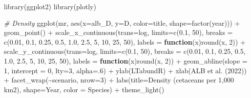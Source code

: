 \documentclass[
]{book}
\newenvironment{Shaded}{\begin{snugshade}}{\end{snugshade}}
\newcommand{\AttributeTok}[1]{\textcolor[rgb]{0.77,0.63,0.00}{#1}}
\newcommand{\CommentTok}[1]{\textcolor[rgb]{0.56,0.35,0.01}{\textit{#1}}}
\newcommand{\ControlFlowTok}[1]{\textcolor[rgb]{0.13,0.29,0.53}{\textbf{#1}}}
\newcommand{\DecValTok}[1]{\textcolor[rgb]{0.00,0.00,0.81}{#1}}
\newcommand{\FloatTok}[1]{\textcolor[rgb]{0.00,0.00,0.81}{#1}}
\newcommand{\FunctionTok}[1]{\textcolor[rgb]{0.00,0.00,0.00}{#1}}
\newcommand{\NormalTok}[1]{#1}
\newcommand{\SpecialCharTok}[1]{\textcolor[rgb]{0.00,0.00,0.00}{#1}}
\newcommand{\StringTok}[1]{\textcolor[rgb]{0.31,0.60,0.02}{#1}}
\begin{document}
\begin{Shaded}
\begin{Highlighting}[]
\FunctionTok{library}\NormalTok{(ggplot2)}
\FunctionTok{library}\NormalTok{(plotly)}

\CommentTok{\# Density}
\FunctionTok{ggplot}\NormalTok{(mr,}
       \FunctionTok{aes}\NormalTok{(}\AttributeTok{x=}\NormalTok{alb\_D, }\AttributeTok{y=}\NormalTok{D, }\AttributeTok{color=}\NormalTok{title, }\AttributeTok{shape=}\FunctionTok{factor}\NormalTok{(year))) }\SpecialCharTok{+}
    \FunctionTok{geom\_point}\NormalTok{() }\SpecialCharTok{+}
    \FunctionTok{scale\_x\_continuous}\NormalTok{(}\AttributeTok{trans=}\StringTok{\textquotesingle{}log\textquotesingle{}}\NormalTok{, }\AttributeTok{limits=}\FunctionTok{c}\NormalTok{(}\FloatTok{0.1}\NormalTok{, }\DecValTok{50}\NormalTok{), }
                       \AttributeTok{breaks =} \FunctionTok{c}\NormalTok{(}\FloatTok{0.01}\NormalTok{, }\FloatTok{0.1}\NormalTok{, }\FloatTok{0.25}\NormalTok{, }\FloatTok{0.5}\NormalTok{, }\FloatTok{1.0}\NormalTok{, }\FloatTok{2.5}\NormalTok{, }\DecValTok{5}\NormalTok{, }\DecValTok{10}\NormalTok{, }\DecValTok{25}\NormalTok{, }\DecValTok{50}\NormalTok{),}
                       \AttributeTok{labels =} \ControlFlowTok{function}\NormalTok{(x)}\FunctionTok{round}\NormalTok{(x, }\DecValTok{2}\NormalTok{)) }\SpecialCharTok{+}
    \FunctionTok{scale\_y\_continuous}\NormalTok{(}\AttributeTok{trans=}\StringTok{\textquotesingle{}log\textquotesingle{}}\NormalTok{, }\AttributeTok{limits=}\FunctionTok{c}\NormalTok{(}\FloatTok{0.1}\NormalTok{, }\DecValTok{50}\NormalTok{), }
                       \AttributeTok{breaks =} \FunctionTok{c}\NormalTok{(}\FloatTok{0.01}\NormalTok{, }\FloatTok{0.1}\NormalTok{, }\FloatTok{0.25}\NormalTok{, }\FloatTok{0.5}\NormalTok{, }\FloatTok{1.0}\NormalTok{, }\FloatTok{2.5}\NormalTok{, }\DecValTok{5}\NormalTok{, }\DecValTok{10}\NormalTok{, }\DecValTok{25}\NormalTok{, }\DecValTok{50}\NormalTok{),}
                       \AttributeTok{labels =} \ControlFlowTok{function}\NormalTok{(x)}\FunctionTok{round}\NormalTok{(x, }\DecValTok{2}\NormalTok{)) }\SpecialCharTok{+}
    \FunctionTok{geom\_abline}\NormalTok{(}\AttributeTok{slope =} \DecValTok{1}\NormalTok{, }\AttributeTok{intercept =} \DecValTok{0}\NormalTok{, }\AttributeTok{lty=}\DecValTok{3}\NormalTok{, }\AttributeTok{alpha=}\NormalTok{.}\DecValTok{6}\NormalTok{) }\SpecialCharTok{+}
    \FunctionTok{ylab}\NormalTok{(}\StringTok{\textquotesingle{}LTabundR\textquotesingle{}}\NormalTok{) }\SpecialCharTok{+} \FunctionTok{xlab}\NormalTok{(}\StringTok{\textquotesingle{}ALB et al. (2022)\textquotesingle{}}\NormalTok{) }\SpecialCharTok{+}
  \FunctionTok{facet\_wrap}\NormalTok{(}\SpecialCharTok{\textasciitilde{}}\NormalTok{scenario, }\AttributeTok{nrow=}\DecValTok{3}\NormalTok{) }\SpecialCharTok{+} 
  \FunctionTok{labs}\NormalTok{(}\AttributeTok{title=}\StringTok{\textquotesingle{}Density (cetaceans per 1,000 km2)\textquotesingle{}}\NormalTok{, }
       \AttributeTok{shape=}\StringTok{\textquotesingle{}Year\textquotesingle{}}\NormalTok{, }\AttributeTok{color =} \StringTok{\textquotesingle{}Species\textquotesingle{}}\NormalTok{) }\SpecialCharTok{+} 
  \FunctionTok{theme\_light}\NormalTok{()}
\end{Highlighting}
\end{Shaded}
\end{document}
